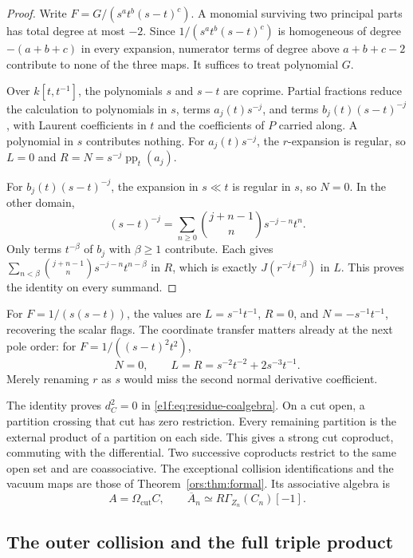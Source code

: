 \begin{proof}
Write \(F=G/(s^at^b(s-t)^c)\). A monomial surviving
two principal parts has total degree at most \(-2\).
Since \(1/(s^at^b(s-t)^c)\) is homogeneous of degree
\(-(a+b+c)\) in every expansion, numerator terms of
degree above \(a+b+c-2\) contribute to none of the three
maps. It suffices to treat polynomial \(G\).

Over \(k[t,t^{-1}]\), the polynomials \(s\) and \(s-t\)
are coprime. Partial fractions reduce the calculation to
polynomials in \(s\), terms \(a_j(t)s^{-j}\), and terms
\(b_j(t)(s-t)^{-j}\), with Laurent coefficients in \(t\)
and the coefficients of \(P\) carried along. A polynomial
in \(s\) contributes nothing. For \(a_j(t)s^{-j}\),
the \(r\)-expansion is regular, so \(L=0\) and
\(R=N=s^{-j}\operatorname{pp}_t(a_j)\).

For \(b_j(t)(s-t)^{-j}\), the expansion in \(s\ll t\)
is regular in \(s\), so \(N=0\). In the other domain,
\[
 (s-t)^{-j}
    =\sum_{n\geq0}\binom{j+n-1}{n}s^{-j-n}t^n.
\]
Only terms \(t^{-\beta}\) of \(b_j\) with \(\beta\geq1\)
contribute. Each gives
\(\sum_{n<\beta}\binom{j+n-1}{n}s^{-j-n}t^{n-\beta}\)
in \(R\), which is exactly \(J(r^{-j}t^{-\beta})\)
in \(L\). This proves the identity on every summand.
\end{proof}

For \(F=1/(s(s-t))\), the values are
\(L=s^{-1}t^{-1}\), \(R=0\), and
\(N=-s^{-1}t^{-1}\), recovering the scalar flags.
The coordinate transfer matters already at the next pole
order: for \(F=1/((s-t)^2t^2)\),
\[
 N=0,\qquad L=R=s^{-2}t^{-2}+2s^{-3}t^{-1}.
\]
Merely renaming \(r\) as \(s\) would miss the second
normal derivative coefficient.

The\label{e1f:def:residue-cut-cobar} identity proves \(d_C^2=0\) in
\eqref{e1f:eq:residue-coalgebra}. On a cut open, a
partition crossing that cut has zero restriction. Every
remaining partition is the external product of a partition
on each side. This gives a strong cut coproduct, commuting
with the differential. Two successive coproducts restrict
to the same open set and are coassociative. The exceptional
collision identifications and the vacuum maps are those
of Theorem~\ref{ors:thm:formal}. Its associative algebra is
\[
 A=\Omega_{\mathrm{cut}}C,
 \qquad \overline A_n\simeq R\Gamma_{Z_n}(C_n)[-1].
\]

\subsection{The outer collision and the full triple product}

